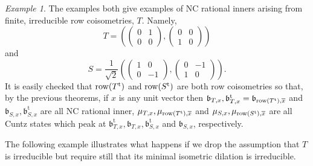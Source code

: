 \documentclass{article}
\theoremstyle{definition}
\theoremstyle{remark}
\newtheorem{example}[thm]{Example}
\numberwithin{equation}{section}
\newcommand{\bpm}{\begin{pmatrix}}
\newcommand{\epm}{\end{pmatrix}}
\newcommand{\mr}{\ensuremath{\mathrm}}
\newcommand{\ov}{\ensuremath{\overline}}
\def\fb{\mathfrak{b}}
\def\fbt{\mathfrak{b} ^{\mathrm{t}}}
\def\mrt{\mathrm{t}}
\begin{document}
\begin{example}
The examples \cite[Example 4.4, Example 4.5]{JMS-ncratClark} both give examples of NC rational inners arising from finite, irreducible row coisometries, $T$. Namely,
$$ T = \left( \bpm 0 & 1 \\ 0 & 0 \epm  , \bpm 0 & 0 \\ 1 & 0 \epm \right)$$
and 
$$ S = \frac{1}{\sqrt{2}} \left( \bpm 1 & 0 \\ 0 & -1 \epm , \bpm 0 & -1 \\ 1 & 0 \epm  \right). $$
It is easily checked that $\mr{row} (T^\mrt)$ and $\mr{row} (S^\mrt )$ are both row coisometries so that, by the previous theorems, if $x$ is any unit vector then $\fb _{T,x}, \fbt _{T,x} = \fb _{\mr{row} (T^\mrt ) , \ov{x} }$ and $\fb _{S,x}, \fbt _{S,x}$ are all NC rational inner, $\mu _{T,x}, \mu _{\mr{row} (T ^\mrt ) , \ov{x}}$ and $\mu _{S,x}, \mu _{\mr{row} (S ^\mrt ) , \ov{x}}$ are all Cuntz states which peak at $\fbt _{T,x}, \fb _{T,x}, \fbt _{S,x}$ and $\fb _{S,x}$, respectively.
\end{example}


The following example illustrates what happens if we drop the assumption that $T$ is irreducible but require still that its minimal isometric dilation is irreducible.
\end{document}
